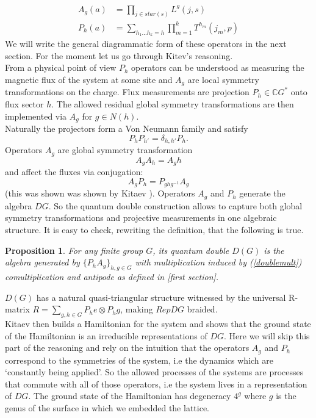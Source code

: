 \documentclass{article}
\newtheorem{proposition}[theorem]{Proposition}
\begin{document}
\begin{equation}\label{doubleonsite}
	\begin{aligned}
	A_g(a) &= \prod_{j \in star(s)} L^g(j,s) \\
	P_h(a) &= \sum_{h_1...h_k=h} \prod_{m=1}^{k} T^{h_m}(j_m,p)
	\end{aligned}
\end{equation}
We will write the general diagrammatic form of these operators in the next section. For the moment let us go through Kitev's reasoning.\\
From a physical point of view $P_h$ operators can be understood as measuring the magnetic flux of the system at some site and $A_g$ are local symmetry transformations on the charge. Flux measurements are projection $P_h \in \mathbb{C}G^*$ onto flux sector $h$. The allowed residual global symmetry transformations are then implemented via $A_g$ for $g \in N(h)$. \\
Naturally the projectors form a Von Neumann family and satisfy 
$$P_hP_{h'}= \delta_{h,h'} P_h.$$ 
Operators $A_g$ are global symmetry transformation 
$$A_gA_h = A_gh$$
and affect the fluxes via conjugation:
\begin{equation}\label{doublemult}
A_gP_h = P_{ghg^{-1}}A_g
\end{equation}
(this was shown was shown by Kitaev \cite{Kitaev03}). Operators $A_g$ and $P_h$ generate the algebra $DG$. So the quantum double construction allows to capture both global symmetry transformations and projective measurements in one algebraic structure. It is easy to check, rewriting the definition, that the following is true. 
\begin{proposition}
	For any finite group $G$, its quantum double $D(G)$ is the algebra generated by $\{P_hA_g\}_{h,g\in G}$ with multiplication induced by (\ref{doublemult}) comultiplication and antipode as defined in [first section]. 
\end{proposition}
$D(G)$ has a natural quasi-triangular structure witnessed by the universal R-matrix $R=\sum_{g,h \in G}P_he \otimes P_hg$, making $RepDG$ braided.\\
Kitaev then builds a Hamiltonian for the system and shows that the ground state of the Hamiltonian is an irreducible representations of $DG$. Here we will skip this part of the reasoning and rely on the intuition that the operators $A_g$ and $P_h$ correspond to the symmetries of the system, i.e the dynamics which are `constantly being applied'. So the allowed processes of the systems are processes that commute with all of those operators, i.e the system lives in a representation of $DG$. The ground state of the Hamiltonian has degeneracy $4^g$ where $g$ is the genus of the surface in which we embedded the lattice.\\
\end{document}
